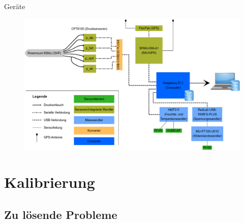 \documentclass[ucs,9pt]{beamer}
\begin{document}
\begin{frame}{Geräte}
	\begin{figure}
		\includegraphics[width=\textwidth]{./docmedia/scheme.png}
	\end{figure}
\end{frame}

\section{Kalibrierung}

\subsection{Zu lösende Probleme}
\end{document}

